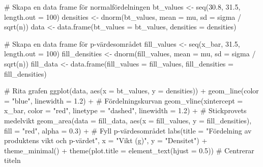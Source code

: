 \documentclass[
  letterpaper,
  DIV=11,
  numbers=noendperiod]{scrartcl}
\newenvironment{Shaded}{\begin{snugshade}}{\end{snugshade}}
\newcommand{\AttributeTok}[1]{\textcolor[rgb]{0.40,0.45,0.13}{#1}}
\newcommand{\CommentTok}[1]{\textcolor[rgb]{0.37,0.37,0.37}{#1}}
\newcommand{\DecValTok}[1]{\textcolor[rgb]{0.68,0.00,0.00}{#1}}
\newcommand{\FloatTok}[1]{\textcolor[rgb]{0.68,0.00,0.00}{#1}}
\newcommand{\FunctionTok}[1]{\textcolor[rgb]{0.28,0.35,0.67}{#1}}
\newcommand{\NormalTok}[1]{\textcolor[rgb]{0.00,0.23,0.31}{#1}}
\newcommand{\OtherTok}[1]{\textcolor[rgb]{0.00,0.23,0.31}{#1}}
\newcommand{\SpecialCharTok}[1]{\textcolor[rgb]{0.37,0.37,0.37}{#1}}
\newcommand{\StringTok}[1]{\textcolor[rgb]{0.13,0.47,0.30}{#1}}
\begin{document}
\begin{Shaded}
\begin{Highlighting}[]
\CommentTok{\# Skapa en data frame för normalfördelningen}
\NormalTok{bt\_values }\OtherTok{\textless{}{-}} \FunctionTok{seq}\NormalTok{(}\FloatTok{30.8}\NormalTok{, }\FloatTok{31.5}\NormalTok{, }\AttributeTok{length.out =} \DecValTok{100}\NormalTok{)}
\NormalTok{densities }\OtherTok{\textless{}{-}} \FunctionTok{dnorm}\NormalTok{(bt\_values, }\AttributeTok{mean =}\NormalTok{ mu, }\AttributeTok{sd =}\NormalTok{ sigma }\SpecialCharTok{/} \FunctionTok{sqrt}\NormalTok{(n))}
\NormalTok{data }\OtherTok{\textless{}{-}} \FunctionTok{data.frame}\NormalTok{(}\AttributeTok{bt\_values =}\NormalTok{ bt\_values, }\AttributeTok{densities =}\NormalTok{ densities)}

\CommentTok{\# Skapa en data frame för p{-}värdesområdet}
\NormalTok{fill\_values }\OtherTok{\textless{}{-}} \FunctionTok{seq}\NormalTok{(x\_bar, }\FloatTok{31.5}\NormalTok{, }\AttributeTok{length.out =} \DecValTok{100}\NormalTok{)}
\NormalTok{fill\_densities }\OtherTok{\textless{}{-}} \FunctionTok{dnorm}\NormalTok{(fill\_values, }\AttributeTok{mean =}\NormalTok{ mu, }\AttributeTok{sd =}\NormalTok{ sigma }\SpecialCharTok{/} \FunctionTok{sqrt}\NormalTok{(n))}
\NormalTok{fill\_data }\OtherTok{\textless{}{-}} \FunctionTok{data.frame}\NormalTok{(}\AttributeTok{fill\_values =}\NormalTok{ fill\_values, }\AttributeTok{fill\_densities =}\NormalTok{ fill\_densities)}

\CommentTok{\# Rita grafen}
\FunctionTok{ggplot}\NormalTok{(data, }\FunctionTok{aes}\NormalTok{(}\AttributeTok{x =}\NormalTok{ bt\_values, }\AttributeTok{y =}\NormalTok{ densities)) }\SpecialCharTok{+}
  \FunctionTok{geom\_line}\NormalTok{(}\AttributeTok{color =} \StringTok{"blue"}\NormalTok{, }\AttributeTok{linewidth =} \FloatTok{1.2}\NormalTok{) }\SpecialCharTok{+}  \CommentTok{\# Fördelningskurvan}
  \FunctionTok{geom\_vline}\NormalTok{(}\AttributeTok{xintercept =}\NormalTok{ x\_bar, }\AttributeTok{color =} \StringTok{"red"}\NormalTok{, }\AttributeTok{linetype =} \StringTok{"dashed"}\NormalTok{, }\AttributeTok{linewidth =} \FloatTok{1.2}\NormalTok{) }\SpecialCharTok{+}  \CommentTok{\# Stickprovets medelvikt}
  \FunctionTok{geom\_area}\NormalTok{(}\AttributeTok{data =}\NormalTok{ fill\_data, }\FunctionTok{aes}\NormalTok{(}\AttributeTok{x =}\NormalTok{ fill\_values, }\AttributeTok{y =}\NormalTok{ fill\_densities), }\AttributeTok{fill =} \StringTok{"red"}\NormalTok{, }\AttributeTok{alpha =} \FloatTok{0.3}\NormalTok{) }\SpecialCharTok{+}  \CommentTok{\# Fyll p{-}värdesområdet}
  \FunctionTok{labs}\NormalTok{(}\AttributeTok{title =} \StringTok{"Fördelning av produktens vikt och p{-}värdet"}\NormalTok{,}
       \AttributeTok{x =} \StringTok{"Vikt (g)"}\NormalTok{, }\AttributeTok{y =} \StringTok{"Densitet"}\NormalTok{) }\SpecialCharTok{+}
  \FunctionTok{theme\_minimal}\NormalTok{() }\SpecialCharTok{+}
  \FunctionTok{theme}\NormalTok{(}\AttributeTok{plot.title =} \FunctionTok{element\_text}\NormalTok{(}\AttributeTok{hjust =} \FloatTok{0.5}\NormalTok{))  }\CommentTok{\# Centrerar titeln}
\end{Highlighting}
\end{Shaded}
\end{document}
